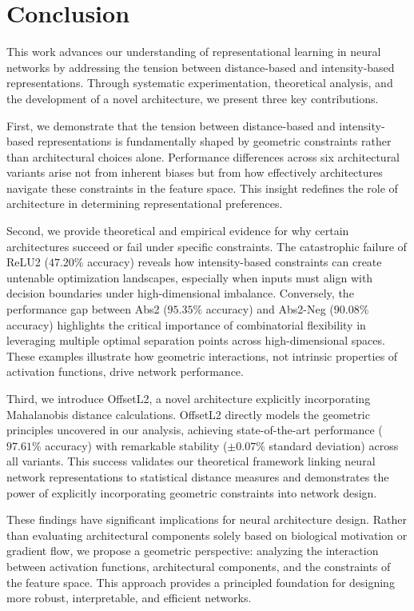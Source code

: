 \section{Conclusion}

This work advances our understanding of representational learning in neural networks by addressing the tension between distance-based and intensity-based representations. Through systematic experimentation, theoretical analysis, and the development of a novel architecture, we present three key contributions.

First, we demonstrate that the tension between distance-based and intensity-based representations is fundamentally shaped by geometric constraints rather than architectural choices alone. Performance differences across six architectural variants arise not from inherent biases but from how effectively architectures navigate these constraints in the feature space. This insight redefines the role of architecture in determining representational preferences.

Second, we provide theoretical and empirical evidence for why certain architectures succeed or fail under specific constraints. The catastrophic failure of ReLU2 ($47.20\%$ accuracy) reveals how intensity-based constraints can create untenable optimization landscapes, especially when inputs must align with decision boundaries under high-dimensional imbalance. Conversely, the performance gap between Abs2 ($95.35\%$ accuracy) and Abs2-Neg ($90.08\%$ accuracy) highlights the critical importance of combinatorial flexibility in leveraging multiple optimal separation points across high-dimensional spaces. These examples illustrate how geometric interactions, not intrinsic properties of activation functions, drive network performance.

Third, we introduce OffsetL2, a novel architecture explicitly incorporating Mahalanobis distance calculations. OffsetL2 directly models the geometric principles uncovered in our analysis, achieving state-of-the-art performance ($97.61\%$ accuracy) with remarkable stability ($\pm0.07\%$ standard deviation) across all variants. This success validates our theoretical framework linking neural network representations to statistical distance measures and demonstrates the power of explicitly incorporating geometric constraints into network design.

These findings have significant implications for neural architecture design. Rather than evaluating architectural components solely based on biological motivation or gradient flow, we propose a geometric perspective: analyzing the interaction between activation functions, architectural components, and the constraints of the feature space. This approach provides a principled foundation for designing more robust, interpretable, and efficient networks. 

